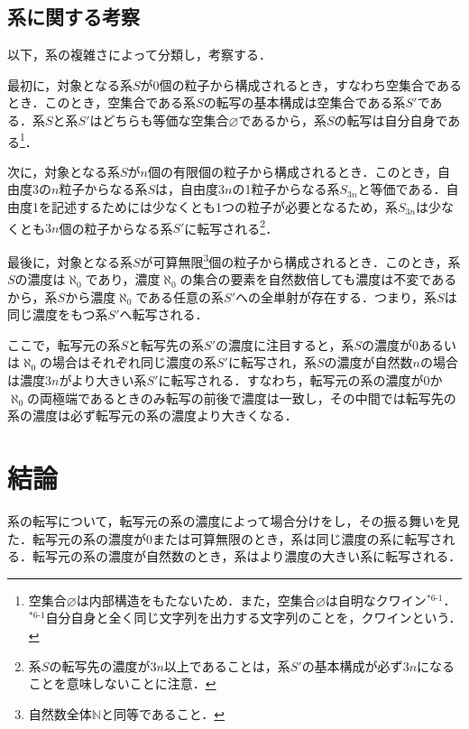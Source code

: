 \documentclass[10pt, a5paper, twoside]{jsarticle}
\theoremstyle{definition}
\begin{document}
		\subsection{系に関する考察}

			以下，系の複雑さによって分類し，考察する．


			最初に，対象となる系$S$が0個の粒子から構成されるとき，すなわち空集合であるとき．このとき，空集合である系$S$の転写の基本構成は空集合である系$S'$である．系$S$と系$S'$はどちらも等価な空集合$\varnothing$であるから，系$S$の転写は自分自身である\footnote{空集合$\varnothing$は内部構造をもたないため．また，空集合$\varnothing$は自明なクワイン$^{*6\text{-}1}$．\\$^{*6\text{-}1}$自分自身と全く同じ文字列を出力する文字列のことを，クワインという\cite{geb}．}．

			次に，対象となる系$S$が$n$個の有限個の粒子から構成されるとき．このとき，自由度3の$n$粒子からなる系$S$は，自由度$3n$の1粒子からなる系$S_{3n}$と等価である．自由度1を記述するためには少なくとも1つの粒子が必要となるため，系$S_{3n}$は少なくとも$3n$個の粒子からなる系$S'$に転写される\footnote{系$S$の転写先の濃度が$3n$以上であることは，系$S'$の基本構成が必ず$3n$になることを意味しないことに注意．}．

			最後に，対象となる系$S$が可算無限\footnote{自然数全体$\mathbb{N}$と同等であること．}個の粒子から構成されるとき．このとき，系$S$の濃度は$\aleph_0$であり，濃度$\aleph_0$の集合の要素を自然数倍しても濃度は不変であるから，系$S$から濃度$\aleph_0$である任意の系$S'$への全単射が存在する．つまり，系$S$は同じ濃度をもつ系$S'$へ転写される．

			ここで，転写元の系$S$と転写先の系$S'$の濃度に注目すると，系$S$の濃度が0あるいは$\aleph_0$の場合はそれぞれ同じ濃度の系$S'$に転写され，系$S$の濃度が自然数$n$の場合は濃度$3n$がより大きい系$S'$に転写される．すなわち，転写元の系の濃度が0か$\aleph_0$の両極端であるときのみ転写の前後で濃度は一致し，その中間では転写先の系の濃度は必ず転写元の系の濃度より大きくなる．

	\section{結論}

		系の転写について，転写元の系の濃度によって場合分けをし，その振る舞いを見た．転写元の系の濃度が0または可算無限のとき，系は同じ濃度の系に転写される．転写元の系の濃度が自然数のとき，系はより濃度の大きい系に転写される．
\end{document}
